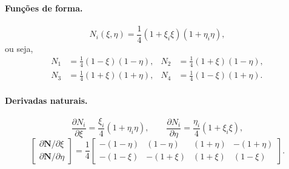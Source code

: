 \documentclass[11pt,a4paper]{article}
\numberwithin{equation}{section}
\begin{document}
\paragraph{Funções de forma.}
\begin{equation}
\boxed{N_i(\xi,\eta)=\frac14(1+\xi_i\xi)(1+\eta_i\eta),}
\end{equation}
ou seja,
\begin{align}
N_1&=\tfrac14(1-\xi)(1-\eta), & N_2&=\tfrac14(1+\xi)(1-\eta),\\
N_3&=\tfrac14(1+\xi)(1+\eta), & N_4&=\tfrac14(1-\xi)(1+\eta).
\end{align}

\paragraph{Derivadas naturais.}
\begin{equation}
\frac{\partial N_i}{\partial\xi}=\frac{\xi_i}{4}(1+\eta_i\eta),\qquad
\frac{\partial N_i}{\partial\eta}=\frac{\eta_i}{4}(1+\xi_i\xi),
\end{equation}
\begin{equation}
\begin{bmatrix}\partial\mathbf N/\partial\xi\\ \partial\mathbf N/\partial\eta\end{bmatrix}
=\frac14\begin{bmatrix}
-(1-\eta)&(1-\eta)&(1+\eta)&-(1+\eta)\\
-(1-\xi)&-(1+\xi)&(1+\xi)&(1-\xi)
\end{bmatrix}.
\end{equation}
\end{document}
